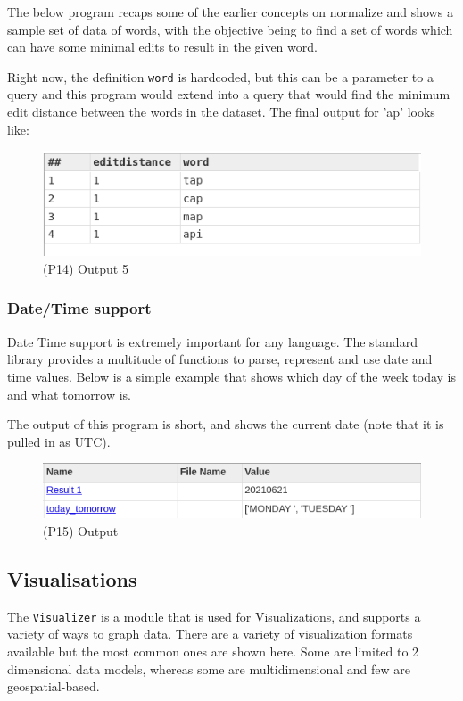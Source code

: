 The below program recaps some of the earlier concepts on normalize and shows a sample set of data of words, with the objective being to find a set of words which can have some minimal edits to result in the given word.

Right now, the definition \lstinline{word} is hardcoded, but this can be a parameter to a query and this program would extend into a query that would find the minimum edit distance between the words in the dataset.
The final output for 'ap' looks like:

\begin{figure}[h]
    \centering
    \includegraphics[width=.6\linewidth]{../output/77/5}
    \caption{(P14) Output 5}
\end{figure}

\subsubsection{Date/Time support}

Date Time support is extremely important for any language. The standard library provides a multitude of functions to parse, represent and use date and time values.
Below is a simple example that shows which day of the week today is and what tomorrow is.




The output of this program is short, and shows the current date (note that it is pulled in as UTC).

\begin{figure}[h]
    \centering
    \includegraphics[width=.6\linewidth]{../output/78/1}
    \caption{(P15) Output}
\end{figure}




\subsection{Visualisations}

The \lstinline!Visualizer! is a module that is used for Visualizations, and supports a variety of ways to graph data. There are a variety of visualization formats available but the most common ones are shown here. Some are limited to 2 dimensional data models, whereas some are multidimensional and few are geospatial-based.


